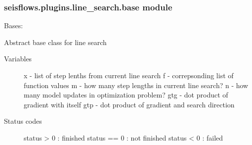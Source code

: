 \documentclass[letterpaper,10pt,english]{sphinxmanual}
\begin{document}
\subsubsection{seisflows.plugins.line\_search.base module}
\label{\detokenize{ref/seisflows.plugins.line_search:module-seisflows.plugins.line_search.base}}\label{\detokenize{ref/seisflows.plugins.line_search:seisflows-plugins-line-search-base-module}}

\begin{fulllineitems}
\label{\detokenize{ref/seisflows.plugins.line_search:seisflows.plugins.line_search.base.Base}}
Bases: 

Abstract base class for line search
\begin{description}
\item[{Variables}] \leavevmode
x - list of step lenths from current line search
f - correpsonding list of function values
m - how many step lengths in current line search?
n - how many model updates in optimization problem?
gtg - dot product of gradient with itself
gtp - dot product of gradient and search direction

\item[{Status codes}] \leavevmode
status \textgreater{} 0  : finished
status == 0 : not finished
status \textless{} 0  : failed

\end{description}

\begin{fulllineitems}
\label{\detokenize{ref/seisflows.plugins.line_search:seisflows.plugins.line_search.base.Base.calculate_step}}
\end{fulllineitems}



\end{fulllineitems}
\end{document}
